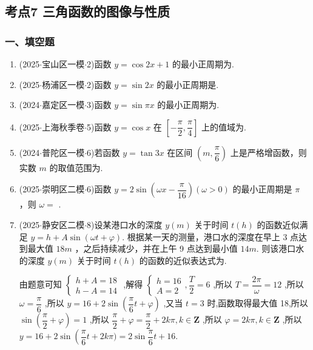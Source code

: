 \subsection*{考点7 三角函数的图像与性质}

\subsubsection*{一、填空题}
\begin{enumerate}
    \item (2025$\cdot$宝山区一模$\cdot$2)函数 $y = \cos {2x} + 1$ 的最小正周期为\blkda[2]{$\pi$}.

    \item (2025$\cdot$杨浦区一模$\cdot$2)函数 $y = \sin {2x}$ 的最小正周期是\blkda[2]{$\pi$}.

    \item (2024$\cdot$嘉定区一模$\cdot$3)函数 $y = \sin {\pi x}$ 的最小正周期为.

    \item (2025$\cdot$上海秋季卷$\cdot$5)函数 $y = \cos x$ 在 $\left\lbrack  {-\dfrac{\pi }{2},\dfrac{\pi }{4}}\right\rbrack$ 上的值域为.

    \item (2024$\cdot$普陀区一模$\cdot$6)若函数 $y = \tan {3x}$ 在区间 $\left( {m,\dfrac{\pi }{6}}\right)$ 上是严格增函数，则实数 $m$ 的取值范围为.

    \item (2025$\cdot$崇明区二模$\cdot$6)函数 $y = 2\sin \left( {{\omega x} - \dfrac{\pi }{16}}\right) \left( {\omega  > 0}\right)$ 的最小正周期是 $\pi$ ，则 $\omega  =$ .

    \item (2025$\cdot$静安区二模$\cdot$8)设某港口水的深度 $y\left( {m}\right)$ 关于时间 $t\left( {h}\right)$ 的函数近似满足 $y = h + A\sin \left( {{\omega t} + \varphi }\right)$. 根据某一天的测量，港口水的深度在早上 3 点达到最大值 ${18}{m}$ ，之后持续减少，并在上午 9 点达到最小值 ${14}{m}$. 则该港口水的深度 $y\left( {m}\right)$ 关于时间 $t\left( {h}\right)$ 的函数的近似表达式为.
    \begin{jieda}
        由题意可知 $\left\{  \begin{array}{l} h + A = {18} \\  h - A = {14} \end{array}\right.$ ,解得 $\left\{  \begin{array}{l} h = {16} \\  A = 2 \end{array}\right. ,\dfrac{T}{2} = 6$ ,所以 $T = \dfrac{2\pi }{\omega } = {12}$ ,所以 $\omega  = \dfrac{\pi }{6}$ ,所以 $y = {16} + 2\sin \left( {\dfrac{\pi }{6}t + \varphi }\right)$ ,又当 $t = 3$ 时,函数取得最大值 18,所以 $\sin \left( {\dfrac{\pi }{2} + \varphi }\right)  = 1$ ,所以 $\dfrac{\pi }{2} +  \varphi  = \dfrac{\pi }{2} + {2k\pi },k \in  \mathbf{Z}$ ,所以 $\varphi  = {2k\pi },k \in  \mathbf{Z}$ ,所以 $y = {16} + 2\sin \left( {\dfrac{\pi }{6}t}\right.  + {2k\pi }) = 2\sin \dfrac{\pi }{6}t + {16}$.
    \end{jieda}


\end{enumerate}
